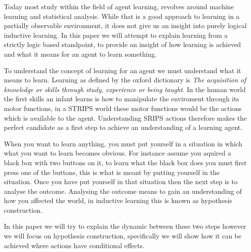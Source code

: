 \documentclass[master.tex]{subfiles}
\begin{document}
	
	Today most study within the field of agent learning, revolves around
	machine learning and statistical analysis. While that is a good approach
	to learning in a partially observable environment, it does not give
	us an insight into purely logical inductive learning. In this paper
	we will attempt to explain learning from a strictly logic based standpoint,
	to provide an insight of how learning is achieved and what it means
	for an agent to learn something. 
	
	To understand the concept of learning for an agent we must understand
	what it means to learn. Learning as defined by the oxford dictionary
	is \emph{The acquisition of knowledge or skills through study, experience
		or being taught}. In the human world the first skills an infant learns
	is how to manipulate the enviroment through its motor functions, in
	a STRIPS world these motor functions would be the actions which is
	available to the agent. Understanding SRIPS actions therefore makes
	the perfect candidate as a first step to achieve an understanding
	of a learning agent. 
	
	When you want to learn anything, you must put yourself in a situation
	in which what you want to learn becomes obvious. For instance assume
	you aquired a black box with two buttons on it, to learn what the
	black box does you must first press one of the buttons, this is what
	is meant by putting yourself in the situation. Once you have put yourself
	in that situation then the next step is to analyse the outcome. Analysing
	the outcome means to gain an understanding of how you affected the
	world, in inductive learning this is known as hypothesis construction.
	
	In this paper we will try to explain the dynamic between these two
	steps however we will focus on hypothesis construction, specifically
	we will show how it can be achieved where actions have conditional
	effects.
	
\end{document}
